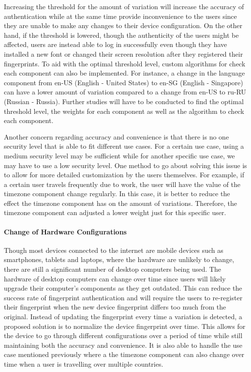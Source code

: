 \documentclass{acm_proc_article-sp}
\begin{document}
Increasing the threshold for the amount of variation will increase the accuracy of  authentication while at the same time provide inconvenience to the users since they are unable to make any changes to their device configuration. On the other hand, if the threshold is lowered, though the authenticity of the users might be affected, users are instead able to log in successfully even though they have installed a new font or changed their screen resolution after they registered their fingerprints. To aid with the optimal threshold level, custom algorithms for check each component can also be implemented. For instance, a change in the language component from en-US (English - United States) to en-SG (English - Singapore) can have a lower amount of variation compared to a change from en-US to ru-RU (Russian - Russia). Further studies will have to be conducted to find the optimal threshold level, the weights for each component as well as the algorithm to check each component.

Another concern regarding accuracy and convenience is that there is no one security level that is able to fit different use cases. For a certain use case, using a medium security level may be sufficient while for another specific use case, we may have to use a low security level. One method to go about solving this issue is to allow for more detailed customization by the users themselves. For example, if a certain user travels frequently due to work, the user will have the value of the timezone component change regularly. In this case, it is better to reduce the effect the timezone component has on the amount of variations. Therefore, the timezone component can adjusted a lower weight just for this specific user.

\paragraph{Change of Hardware Configurations}
Though most devices connected to the internet are mobile devices such as smartphones, tablets and laptops, where the hardware are unlikely to change, there are still a significant number of desktop computers being used. The hardware of desktop computers can change over time since users will likely upgrade their computer's components as they get outdated. This can reduce the success rate of fingerprint authentication and will require the users to re-register their fingerprint when the new device fingerprint differs too much from the original. Instead of updating the fingerprint every time a variation is detected, a proposed solution is to normalize the device fingerprint over time. This allows for the device to go through different configurations over a period of time while still maintaining both the accuracy and convenience. It is also able to handle the use case mentioned previously where a the timezone component can also change over time when a user is travelling over multiple countries.
\end{document}
